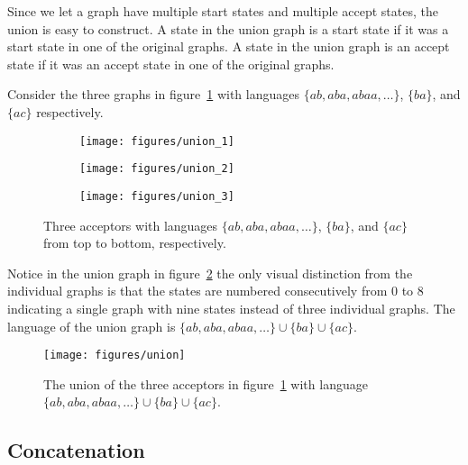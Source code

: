Since we let a graph have multiple start states and multiple accept states, the
union is  easy to construct. A state in the union graph is a start state if it
was a start state in one of the original graphs. A state in the union graph is
an accept state if it was an accept state in one of the original graphs.

Consider the three graphs in figure~\ref{fig:union_inputs} with languages
$\{ab, aba, abaa, \ldots\}$, $\{ba\}$, and $\{ac\}$ respectively.

\begin{figure}
    \centering
    \begin{subfigure}[b]{0.8\textwidth}
        \centering
        \texttt{[image: figures/union\_1]}
        \caption{}
    \end{subfigure}
    \par\bigskip
    \begin{subfigure}[b]{0.8\textwidth}
        \centering
        \texttt{[image: figures/union\_2]}
        \caption{}
    \end{subfigure}
    \par\bigskip
    \begin{subfigure}[b]{0.8\textwidth}
        \centering
        \texttt{[image: figures/union\_3]}
        \caption{}
    \end{subfigure}
    \caption{Three acceptors with languages $\{ab, aba, abaa, \ldots\}$,
    $\{ba\}$, and $\{ac\}$ from top to bottom, respectively.}
    \label{fig:union_inputs}
\end{figure}

Notice in the union graph in figure~\ref{fig:union} the only visual distinction
from the individual graphs is that the states are numbered consecutively from
$0$ to $8$ indicating a single graph with nine states instead of three
individual graphs. The language of the union graph is $\{ab, aba, abaa,
\ldots\} \cup \{ba\} \cup \{ac\}$.

\begin{figure}
    \centering
    \texttt{[image: figures/union]}
    \caption{The union of the three acceptors in figure~\ref{fig:union_inputs}
    with language $\{ab, aba, abaa, \ldots\} \cup \{ba\} \cup \{ac\}$.}
    \label{fig:union}
\end{figure}

\subsection{Concatenation}

